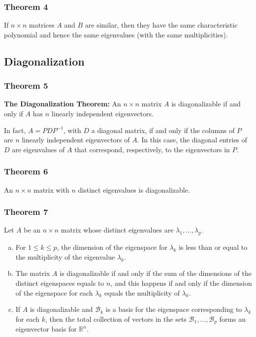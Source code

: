 \documentclass[letterpaper,11pt]{article}
\begin{document}
			\subsubsection{Theorem 4}
				If $n\times n$ matrices $A$ and $B$ are similar, then they have the same characteristic polynomial and hence the same eigenvalues (with the same multiplicities).
		\subsection{Diagonalization}
			\subsubsection{Theorem 5}
				\textbf{The Diagonalization Theorem:} An $n\times n$ matrix $A$ is diagonalizable if and only if $A$ has $n$ linearly independent eigenvectors.
				
				In fact, $A=PDP^{-1}$, with $D$ a diagonal matrix, if and only if the columns of $P$ are $n$ linearly independent eigenvectors of $A$. In this case, the diagonal entries of $D$ are eigenvalues of $A$ that correspond, respectively, to the eigenvectors in $P$.
			\subsubsection{Theorem 6}
				An $n\times n$ matrix with $n$ distinct eigenvalues is diagonalizable.
			\subsubsection{Theorem 7}
				Let $A$ be an $n\times n$ matrix whose distinct eigenvalues are $\lambda_1,\dots,\lambda_p$.
				\begin{enumerate}[a.]
					\item For $1\leq k\leq p$, the dimension of the eigenspace for $\lambda_k$ is less than or equal to the multiplicity of the eigenvalue $\lambda_k$.
					\item The matrix $A$ is diagonalizable if and only if the sum of the dimensions of the distinct eigenspaces equals to $n$, and this happens if and only if the dimension of the eigenspace for each $\lambda_k$ equals the multiplicity of $\lambda_k$.
					\item If $A$ is diagonalizable and $\mathcal{B}_k$ is a basis for the eigenspace corresponding to $\lambda_k$ for each $k$, then the total collection of vectors in the sets $\mathcal{B}_1,\dots,\mathcal{B}_p$ forms an eigenvector basis for $\mathbb{R}^n$.
				\end{enumerate}
\end{document}

